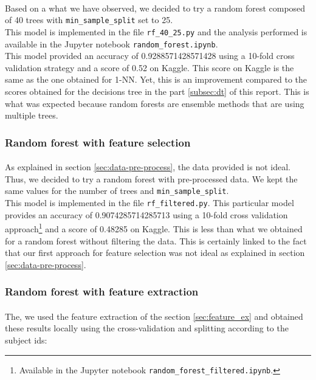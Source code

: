 \documentclass[a4paper, 11pt, oneside]{article}
\begin{document}
\paragraph{}Based on a what we have observed, we decided to try a random forest composed of 40 trees with \texttt{min\_sample\_split} set to 25.\\
This model is implemented in the file \texttt{rf\_40\_25.py} and the analysis performed is available in the Jupyter notebook \texttt{random\_forest.ipynb}.\\
This model provided an accuracy of 0.9288571428571428 using a 10-fold cross validation strategy and a score of 0.52 on Kaggle. This score on Kaggle is the same as the one obtained for 1-NN. Yet, this is an improvement compared to the scores obtained for the decisions tree in the part \ref{subsec:dt} of this report. This is what was expected because random forests are ensemble methods that are using multiple trees.

\subsubsection{Random forest with feature selection} \label{subsubsec:rfFiltered}
\paragraph{}As explained in section \ref{sec:data-pre-process}, the data provided is not ideal. Thus, we decided to try a random forest with pre-processed data. We kept the same values for the number of trees and \texttt{min\_sample\_split}.\\
This model is implemented in the file \texttt{rf\_filtered.py}. This particular model provides an accuracy of 0.9074285714285713 using a 10-fold cross validation approach\footnote{Available in the Jupyter notebook \texttt{random\_forest\_filtered.ipynb}.} and a score of 0.48285 on Kaggle. This is less than what we obtained for a random forest without filtering the data. This is certainly linked to the fact that our first approach for feature selection was not ideal as explained in section \ref{sec:data-pre-process}.

\subsubsection{Random forest with feature extraction} \label{subsubsec:rf_feature_extraction}
\paragraph{}The, we used the feature extraction of the section \ref{sec:feature_ex} and obtained these results locally using the cross-validation and splitting according to the subject ids: 
\end{document}
